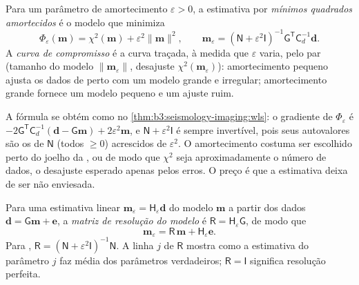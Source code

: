 \begin{definition}\label{def:b3:seismology-imaging:damped}
Para um parâmetro de amortecimento $\varepsilon > 0$, a estimativa por \emph{mínimos quadrados amortecidos}
é o modelo que minimiza
\[
  \Phi_\varepsilon(\mathbf m) = \chi^2(\mathbf m) + \varepsilon^2\|\mathbf m\|^2 ,
  \qquad
  \mathbf m_\varepsilon = \left(\mathsf N + \varepsilon^2\mathsf I\right)^{-1}
  \mathsf G^{\mathsf T}\mathsf C_d^{-1}\mathbf d .
\]
A \emph{curva de compromisso} é a curva traçada, à medida que
$\varepsilon$ varia, pelo par (tamanho do modelo $\|\mathbf m_\varepsilon\|$,
desajuste $\chi^2(\mathbf m_\varepsilon)$): amortecimento pequeno ajusta os dados de perto
com um modelo grande e irregular; amortecimento grande fornece um modelo pequeno e um ajuste ruim.
\end{definition}

A fórmula se obtém como no \cref{thm:b3:seismology-imaging:wls}: o gradiente
de $\Phi_\varepsilon$ é $-2\mathsf G^{\mathsf T}\mathsf C_d^{-1}(\mathbf d -
\mathsf G\mathbf m) + 2\varepsilon^2\mathbf m$, e $\mathsf N + \varepsilon^2
\mathsf I$ é sempre invertível, pois seus autovalores são os de
$\mathsf N$ (todos $\ge 0$) acrescidos de $\varepsilon^2$. O amortecimento costuma ser
escolhido perto do joelho da , ou de modo que $\chi^2$ seja aproximadamente
o número de dados, o desajuste esperado apenas pelos erros. O preço é que a
estimativa deixa de ser não enviesada.

\begin{definition}\label{def:b3:seismology-imaging:resolution}
Para uma estimativa linear $\mathbf m_\varepsilon = \mathsf H_\varepsilon \mathbf d$
do modelo $\mathbf m$ a partir dos dados $\mathbf d = \mathsf G\mathbf m + \mathbf e$,
a \emph{matriz de resolução do modelo} é
$\mathsf R = \mathsf H_\varepsilon\mathsf G$, de modo que
\[
  \mathbf m_\varepsilon = \mathsf R\,\mathbf m + \mathsf H_\varepsilon\mathbf e .
\]
Para , $\mathsf R = (\mathsf N + \varepsilon^2\mathsf I)^{-1}
\mathsf N$. A linha $j$ de $\mathsf R$ mostra como a estimativa do parâmetro $j$
faz média dos parâmetros verdadeiros; $\mathsf R = \mathsf I$ significa resolução perfeita.
\end{definition}

